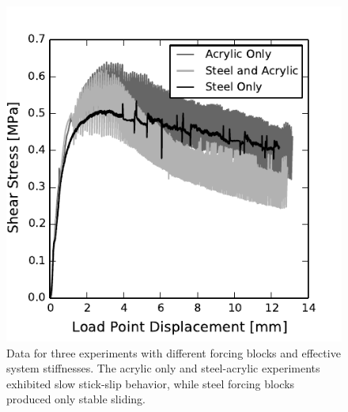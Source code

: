 \begin{figure}
\begin{centering}
\includegraphics{chap_granular_stiffness/Fig5.pdf}
\caption{\label{fig:comp_runplots}
Data for three experiments with different forcing blocks and effective system stiffnesses.  The acrylic only and steel-acrylic experiments exhibited slow stick-slip behavior, while steel forcing blocks produced only stable sliding.}
\end{centering}
\end{figure}



